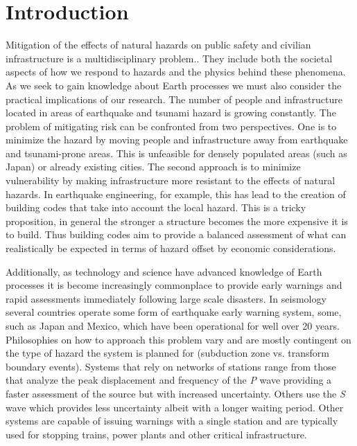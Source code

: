 
\chapter{Introduction}

Mitigation of the effects of natural hazards on public safety and civilian infrastructure is a multidisciplinary problem.. They include both the societal aspects of how we respond to hazards and the physics behind these phenomena. As we seek to gain knowledge about Earth processes we must also consider the practical implications of our research. The number of people and infrastructure located in areas of earthquake and tsunami hazard is growing constantly. The problem of mitigating risk can be confronted from two perspectives. One is to minimize the hazard by moving people and infrastructure away from earthquake and tsunami-prone areas. This is unfeasible for densely populated areas (such as Japan) or already existing cities. The second approach is to minimize vulnerability by making infrastructure more resistant to the effects of natural hazards. In earthquake engineering, for example, this has lead to the creation of building codes that take into account the local hazard. This is a tricky proposition, in general the stronger a structure becomes the more expensive it is to build. Thus building codes aim to provide a balanced assessment of what can realistically be expected in terms of hazard offset by economic considerations.

Additionally, as technology and science have advanced knowledge of Earth processes it is become increasingly commonplace to provide early warnings and rapid assessments immediately following large scale disasters. In seismology several countries operate some form of earthquake early warning \citep{allen2009} system, some, such as Japan and Mexico, which have been operational for well over 20 years. Philosophies on how to approach this problem vary and are mostly contingent on the type of hazard the system is planned for (subduction zone vs. transform boundary events). Systems that rely on networks of stations range from those that analyze the peak displacement and frequency of the \textit{P} wave \citep{kamigaichi2009} providing a faster assessment of the source but with increased uncertainty. Others use the \textit{S} wave \citep{espinosa2009} which provides less uncertainty albeit with a longer waiting period. Other systems are capable of issuing warnings with a single station \citep{nakamura2007} and are typically used for stopping trains, power plants and other critical infrastructure.

